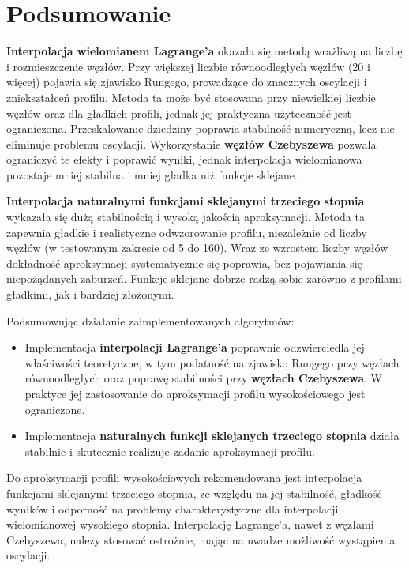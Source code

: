 \documentclass[11pt,a4paper]{article}
\begin{document}
\section{Podsumowanie}
\label{sec:podsumowanie}
\textbf{Interpolacja wielomianem Lagrange'a} okazała się metodą wrażliwą na liczbę i rozmieszczenie węzłów. Przy większej liczbie równoodległych węzłów (20 i więcej) pojawia się zjawisko Rungego, prowadzące do znacznych oscylacji i zniekształceń profilu. Metoda ta może być stosowana przy niewielkiej liczbie węzłów oraz dla gładkich profili, jednak jej praktyczna użyteczność jest ograniczona. Przeskalowanie dziedziny poprawia stabilność numeryczną, lecz nie eliminuje problemu oscylacji. Wykorzystanie \textbf{węzłów Czebyszewa} pozwala ograniczyć te efekty i poprawić wyniki, jednak interpolacja wielomianowa pozostaje mniej stabilna i mniej gładka niż funkcje sklejane.

\textbf{Interpolacja naturalnymi funkcjami sklejanymi trzeciego stopnia} wykazała się dużą stabilnością i wysoką jakością aproksymacji. Metoda ta zapewnia gładkie i realistyczne odwzorowanie profilu, niezależnie od liczby węzłów (w testowanym zakresie od 5 do 160). Wraz ze wzrostem liczby węzłów dokładność aproksymacji systematycznie się poprawia, bez pojawiania się niepożądanych zaburzeń. Funkcje sklejane dobrze radzą sobie zarówno z profilami gładkimi, jak i bardziej złożonymi.
\vspace{1em}

Podsumowując działanie zaimplementowanych algorytmów:
\begin{itemize}
    \item Implementacja \textbf{interpolacji Lagrange'a} poprawnie odzwierciedla jej właściwości teoretyczne, w tym podatność na zjawisko Rungego przy węzłach równoodległych oraz poprawę stabilności przy \textbf{węzłach Czebyszewa}. W praktyce jej zastosowanie do aproksymacji profilu wysokościowego jest ograniczone.
    \item Implementacja \textbf{naturalnych funkcji sklejanych trzeciego stopnia} działa stabilnie i skutecznie realizuje zadanie aproksymacji profilu.
\end{itemize}

Do aproksymacji profili wysokościowych rekomendowana jest interpolacja funkcjami sklejanymi trzeciego stopnia, ze względu na jej stabilność, gładkość wyników i odporność na problemy charakterystyczne dla interpolacji wielomianowej wysokiego stopnia. Interpolację Lagrange'a, nawet z węzłami Czebyszewa, należy stosować ostrożnie, mając na uwadze możliwość wystąpienia oscylacji.
\end{document}
